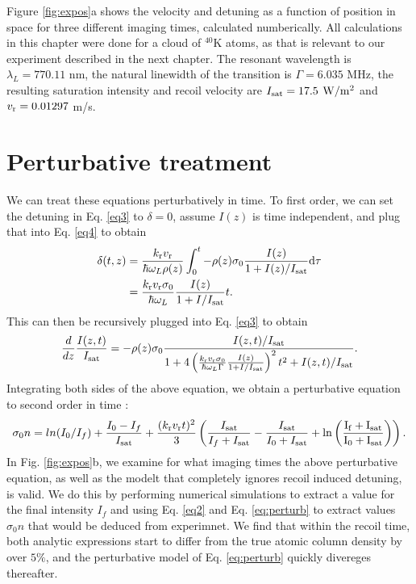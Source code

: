 Figure \ref{fig:expos}a shows the velocity and detuning as a function of position in space for three different imaging times, calculated numberically. All calculations in this chapter were done for a cloud of $^{40}\mathrm{K}$ atoms, as that is relevant to our experiment described in the next chapter. The resonant wavelength is $\lambda_L = 770.11$ nm, the natural linewidth of the transition is $\Gamma =  6.035$ MHz, the resulting saturation intensity and recoil velocity are $I_{\rm sat} = 17.5$ $ \rm{W/m^2}$ and $v_{\rm r}=0.01297$ m/s.  

\section{Perturbative treatment}
We can treat these equations perturbatively in time. To first order, we can set the detuning in Eq. \ref{eq3} to $\delta=0$, assume $I(z)$ is time independent, and plug that into Eq. \ref{eq4} to obtain 
\begin{align}
\delta(t,z)&=\frac{ k_{\rm{r}} v_{\rm{r}}}{\hbar\omega_L\rho(z)}\int_0^t-\rho(z)\sigma_0\frac{I(z)}{1+I(z)/I_{\rm{sat}}}\mathrm{d}\tau \\
&=\frac{ k_{\rm{r}} v_{\rm{r}}\sigma_0}{\hbar\omega_L}\frac{I(z)}{1+I/I_{\rm{sat}}}t.
\label{eq:recursive}
\end{align} 
This can then be recursively plugged into Eq. \ref{eq3} to obtain
\begin{equation}
\frac{d}{dz}\frac{I(z,t)}{I_{\rm{sat}}}=-\rho(z)\sigma_0\frac{I(z,t)/I_{\rm{sat}}}{1+4\left(\frac{ k_{\rm{r}} v_{\rm{r}}\sigma_0}{\hbar\omega_L\Gamma}\frac{I(z)}{1+I/I_{\rm{sat}}}\right)^2 t^2 +I(z,t)/I_{\rm{sat}}}.
\end{equation}
Integrating both sides of the above equation, we obtain a perturbative equation to second order in time \cite{LJLthesis}:
\begin{equation}
\sigma_0 n = ln(I_0/I_f) + \frac{I_0-I_f}{I_{\rm{sat}}} + \frac{ (k_{\rm{r}} v_{\rm{r}} t)^2}{3}\left(\frac{I_{\rm{sat}}}{I_f+I_{\rm{sat}}}-\frac{I_{\rm{sat}}}{I_0+I_{\rm{sat}}} +\rm{ ln}\left(\frac{I_f+I_{\rm{sat}}}{I_0+I_{\rm{sat}}}\right)\right).
\label{eq:perturb}
\end{equation}
In Fig. \ref{fig:expos}b, we examine for what imaging times the above perturbative equation, as well as the modelt that completely ignores recoil induced detuning, is valid. We do this by performing numerical simulations to extract a value for the final intensity $I_f$ and using Eq. \ref{eq2} and Eq. \ref{eq:perturb} to extract values $\sigma_0 n$ that would be deduced from experimnet. We find that within the recoil time, both analytic expressions start to differ from the true atomic column density by over $5\%$, and the perturbative model of Eq. \ref{eq:perturb} quickly divereges thereafter. 

